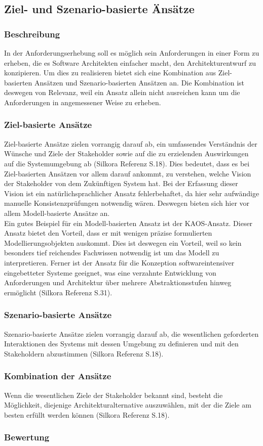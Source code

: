 \subsection{Ziel- und Szenario-basierte Änsätze}
\subsubsection{Beschreibung}
In der Anforderungserhebung soll es möglich sein Anforderungen in einer Form zu erheben, die es Software Architekten einfacher macht, den Architekturentwurf zu konzipieren. Um dies zu realisieren bietet sich eine Kombination aus Ziel-basierten Ansätzen und Szenario-basierten Ansätzen an. Die Kombination ist deswegen von Relevanz, weil ein Ansatz allein nicht ausreichen kann um die Anforderungen in angemessener Weise zu erheben.
\subsubsection{Ziel-basierte Ansätze}
Ziel-basierte Ansätze zielen vorrangig darauf ab, ein umfassendes Verständnis der Wünsche und Ziele der Stakeholder sowie auf die zu erzielenden Auswirkungen auf die Systemumgebung ab (Silkora Referenz S.18). Dies bedeutet, dass es bei Ziel-basierten Ansätzen vor allem darauf ankommt, zu verstehen, welche Vision der Stakeholder von dem Zukünftigen System hat. Bei der Erfassung dieser Vision ist ein natürlichsprachlicher Ansatz fehlerbehaftet, da hier sehr aufwändige manuelle Konsistenzprüfungen notwendig wären. Deswegen bieten sich hier vor allem Modell-basierte Ansätze an.\\
Ein gutes Beispiel für ein Modell-basierten Ansatz ist der KAOS-Ansatz. Dieser Ansatz bietet den Vorteil, dass er mit wenigen präzise formulierten Modellierungsobjekten auskommt. Dies ist deswegen ein Vorteil, weil so kein besonders tief reichendes Fachwissen notwendig ist um das Modell zu interpretieren. Ferner ist der Ansatz für die Konzeption softwareintensiver eingebetteter Systeme geeignet, was eine verzahnte Entwicklung von Anforderungen und Architektur über mehrere Abstraktionsstufen hinweg ermöglicht (Silkora Referenz S.31).\\

\subsubsection{Szenario-basierte Ansätze}
Szenario-basierte Ansätze zielen vorrangig darauf ab, die wesentlichen geforderten Interaktionen des Systems mit dessen Umgebung zu definieren und mit den Stakeholdern abzustimmen (Silkora Referenz S.18).
\subsubsection{Kombination der Ansätze}
Wenn die wesentlichen Ziele der Stakeholder bekannt sind, besteht die Möglichkeit, diejenige Architekturalternative auszuwählen, mit der die Ziele am besten erfüllt werden können (Silkora Referenz S.18).
\subsubsection{Bewertung}
